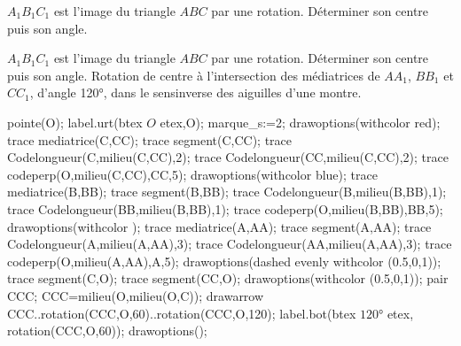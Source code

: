 \begin{exercice*}
    $A_1B_1C_1$ est l'image du triangle $ABC$ par une rotation. Déterminer son centre puis son angle.
    \hspace*{-10mm}
    \begin{Geometrie}[CoinHD={(9u,7u)}]        
        \enonceTroisiemeGTroisExoDouze
    \end{Geometrie}
\end{exercice*}
\begin{corrige}
    $A_1B_1C_1$ est l'image du triangle $ABC$ par une rotation. Déterminer son centre puis son angle.
    {\red Rotation de centre à l'intersection des médiatrices de $AA_1$, $BB_1$ et $CC_1$, d'angle \ang{120}, dans le sensinverse des aiguilles d'une montre.}

    \hspace*{-10mm}
    \begin{Geometrie}[CoinHD={(9u,7u)}]
        \enonceTroisiemeGTroisExoDouze
        pointe(O);
        label.urt(btex $O$ etex,O);
        marque_s:=2;
        drawoptions(withcolor red);
        trace mediatrice(C,CC);
        trace segment(C,CC);
        trace Codelongueur(C,milieu(C,CC),2);
        trace Codelongueur(CC,milieu(C,CC),2);
        trace codeperp(O,milieu(C,CC),CC,5);
        drawoptions(withcolor blue);
        trace mediatrice(B,BB);
        trace segment(B,BB);
        trace Codelongueur(B,milieu(B,BB),1);
        trace Codelongueur(BB,milieu(B,BB),1);
        trace codeperp(O,milieu(B,BB),BB,5);
        drawoptions(withcolor \myMetapostGreen);
        trace mediatrice(A,AA);
        trace segment(A,AA);
        trace Codelongueur(A,milieu(A,AA),3);
        trace Codelongueur(AA,milieu(A,AA),3);
        trace codeperp(O,milieu(A,AA),A,5);
        drawoptions(dashed evenly withcolor (0.5,0,1));
        trace segment(C,O);
        trace segment(CC,O);
        drawoptions(withcolor (0.5,0,1));
        pair CCC;
        CCC=milieu(O,milieu(O,C));
        drawarrow CCC..rotation(CCC,O,60)..rotation(CCC,O,120);
        label.bot(btex $\ang{120}$ etex, rotation(CCC,O,60));
        drawoptions();    
    \end{Geometrie}
    \vspace*{-12mm}
\end{corrige}

